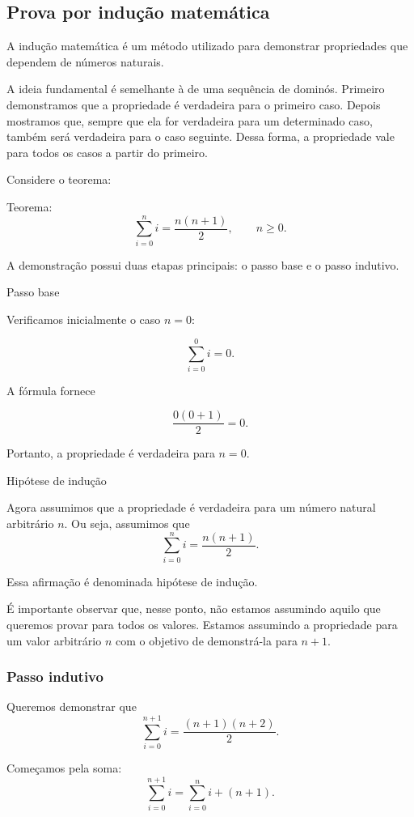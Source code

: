 \documentclass[
  brazilian,
  letterpaper,
]{book}
\theoremstyle{plain}
\theoremstyle{definition}
\theoremstyle{remark}
\begin{document}
\subsection{Prova por indução
matemática}\label{prova-por-induuxe7uxe3o-matemuxe1tica}

A indução matemática é um método utilizado para demonstrar propriedades
que dependem de números naturais.

A ideia fundamental é semelhante à de uma sequência de dominós. Primeiro
demonstramos que a propriedade é verdadeira para o primeiro caso. Depois
mostramos que, sempre que ela for verdadeira para um determinado caso,
também será verdadeira para o caso seguinte. Dessa forma, a propriedade
vale para todos os casos a partir do primeiro.

Considere o teorema:

Teorema: \[
\sum_{i = 0}^n i = 
\frac{n(n+1)}{2},
\qquad n\geq0.
\]

A demonstração possui duas etapas principais: o passo base e o passo
indutivo.

Passo base

Verificamos inicialmente o caso \(n=0\):

\[
\sum_{i=0}^{0}i=0.
\]

A fórmula fornece

\[
\frac{0(0+1)}{2}=0.
\]

Portanto, a propriedade é verdadeira para \(n=0\).

Hipótese de indução

Agora assumimos que a propriedade é verdadeira para um número natural
arbitrário \(n\). Ou seja, assumimos que \[
\sum_{i = 0}^n i = 
\frac{n(n+1)}{2}.
\]

Essa afirmação é denominada hipótese de indução.

É importante observar que, nesse ponto, não estamos assumindo aquilo que
queremos provar para todos os valores. Estamos assumindo a propriedade
para um valor arbitrário \(n\) com o objetivo de demonstrá-la para
\(n+1\).

\subsubsection{Passo indutivo}\label{passo-indutivo}

Queremos demonstrar que \[
\sum_{i = 0}^{n + 1}  i = 
\frac{(n+1)(n+2)}{2}.
\]

Começamos pela soma: \[
\sum_{i = 0}^{n + 1}  i = 
\sum_{i=0}^{n}i+(n+1).
\]
\end{document}
